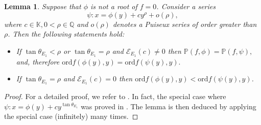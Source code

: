 \documentclass[reqno, 12pt ,a4letter]{amsart}
\newtheorem {lemma}[theorem]{Lemma}
\theoremstyle{definition}
\begin{document}
\begin{lemma} \label{lemma-sliding}
	Suppose that $\phi$ is not a root of $f = 0$. Consider a series 
	$$\psi : x = \phi(y) + c y^{\rho} + o(\rho),$$
	where $c \in \mathbb{K},0<\rho \in \mathbb{Q}$ and $o(\rho)$ denotes a Puiseux series of order greater than $\rho$. Then the following statements hold:
	\begin{itemize}
		\item[(i)] If $\tan \theta_{E_1} < \rho$ or $\tan \theta_{E_1}= \rho$ and $\mathcal{E}_{E_1}(c) \ne 0$ then 
		$\mathbb{P}(f, \phi) = \mathbb{P}(f, \psi),$ and, therefore
		$\mathrm{ord} f(\phi(y), y) = \mathrm{ord} f(\psi(y), y).$
		
		\item[(ii)] If $\tan \theta_{E_1}= \rho$ and $\mathcal{E}_{E_1}(c)  = 0$ then $\mathrm{ord} f(\phi(y), y) < \mathrm{ord} f(\psi(y), y)$.
	\end{itemize}
\end{lemma}
\begin{proof} For a detailed proof, we refer to \cite{HD08}. In fact, the special case where $\psi : x = \phi(y) + c y^{\tan \theta_{E_1}}$ was proved in \cite[Lemma 2.1]{HD08}. The lemma is then deduced by applying the special case (infinitely) many times.
\end{proof}
\end{document}
